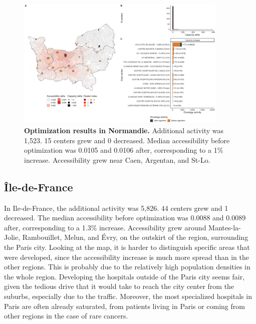 \begin{figure}[H]
    \includegraphics[width=0.9\textwidth]{images/camion/optim_region/optim_Normandie.png}
    \centering
    \caption{ \textbf{Optimization results in Normandie.} Additional activity
        was 1,523. 15 centers grew and 0 decreased. Median accessibility before
        optimization was 0.0105 and 0.0106 after, corresponding to a 1\%
        increase. Accessibility grew near Caen, Argentan, and St-Lo. }
\end{figure}

\subsection*{Île-de-France}

In Ile-de-France, the additional activity was 5,826. 44 centers grew and 1
decreased. The median accessibility before optimization was 0.0088 and
0.0089 after, corresponding to a 1.3\% increase. Accessibility grew
around Mantes-la-Jolie, Rambouillet, Melun, and Évry, on the outskirt of the
region, surrounding the Paris city. Looking at the map, it is harder to
distinguish specific areas that were developed, since the accessibility
increase is much more spread than in the other regions. This is probably
due to the relatively high population densities in the whole region. Developing
the hospitals outside of the Paris city seems fair, given the tedious drive
that it would take to reach the city center from the suburbs, especially due to
the traffic. Moreover, the most specialized hospitals in Paris are often
already saturated, from patients living in Paris or coming from other regions
in the case of rare cancers.

